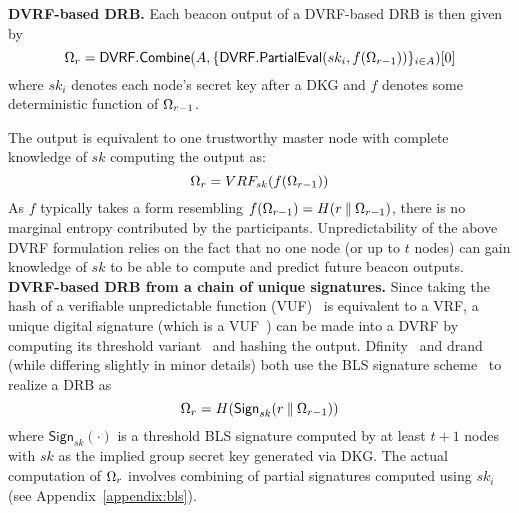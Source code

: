 \noindent\textbf{DVRF-based DRB.} Each beacon output of a DVRF-based DRB is then given by
\begingroup\makeatletter\def\f@size{8}\check@mathfonts
\[
\Omega_r = \mathsf{DVRF.Combine}(A, \{\mathsf{DVRF.PartialEval}(sk_i, f(\Omega_{r - 1}))\}_{i \in A})[0]
\]\endgroup
where $sk_i$ denotes each node's secret key after a DKG and $f$ denotes some deterministic function of $\Omega_{r - 1}$.

The output is equivalent to one trustworthy master node with complete knowledge of $sk$ computing the output as:
\[
\Omega_r = VRF_{sk}(f(\Omega_{r - 1}))
\]
As $f$ typically takes a form resembling $f(\Omega_{r - 1}) = H(r \mathbin\Vert \Omega_{r - 1})$, there is no marginal entropy contributed by the participants. Unpredictability of the above DVRF formulation relies on the fact that no one node (or up to $t$ nodes) can gain knowledge of $sk$ to be able to compute and predict future beacon outputs.\\

\noindent\textbf{DVRF-based DRB from a chain of unique signatures.} Since taking the hash of a verifiable unpredictable function (VUF)~\cite{micali1999verifiable} is equivalent to a VRF, a unique digital signature (which is a VUF~\cite{dodis2005verifiable}) can be made into a DVRF by computing its threshold variant~\cite{boldyreva2003threshold} and hashing the output. Dfinity~\cite{hanke2018dfinity} and drand~\cite{drand} (while differing slightly in minor details) both use the BLS signature scheme~\cite{boneh2001short} to realize a DRB as
\[
\Omega_r = H(\mathsf{Sign}_{sk}(r \mathbin\Vert \Omega_{r - 1}))
\]
where $\mathsf{Sign}_{sk}(\cdot)$ is a threshold BLS signature computed by at least $t + 1$ nodes with $sk$ as the implied group secret key generated via DKG. The actual computation of $\Omega_r$ involves combining of partial signatures computed using $sk_i$ (see Appendix~\ref{appendix:bls}).\\

